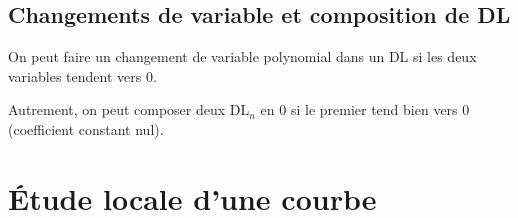     \subsection{Changements de variable et composition de DL}

        On peut faire un changement de variable polynomial dans un DL si les deux variables tendent vers $0$.
        \medskip

        Autrement, on peut composer deux DL$_n$ en $0$ si le premier tend bien vers $0$ (coefficient constant nul).



\section{Étude locale d'une courbe}





